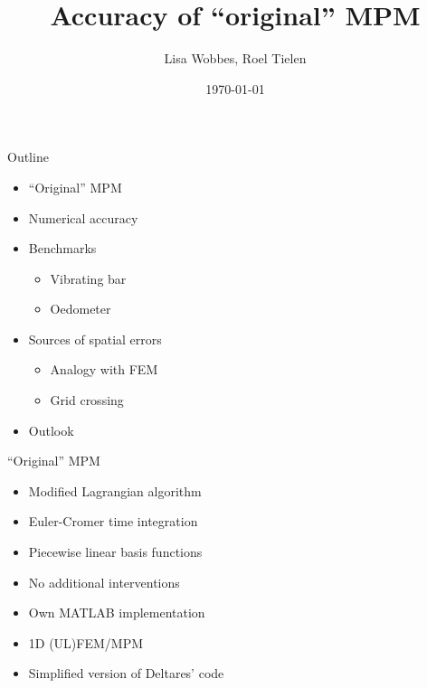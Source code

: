 \documentclass[mathserif,professionalfont,hyperref={pdfpagelabels=false}]{beamer}
\title[Accuracy of ``original'' MPM]{Accuracy of ``original'' MPM}
\author[]{Lisa Wobbes, Roel Tielen}
\date[\today]{\today}
\begin{document}
{
\frame{\titlepage}
}

\begin{frame}{Outline}
\begin{itemize}
\item ``Original'' MPM
\item Numerical accuracy
\item Benchmarks
	\begin{itemize}
	\item Vibrating bar 
	\item Oedometer
	\end{itemize}
\item Sources of spatial errors
\begin{itemize}
\item Analogy with FEM
\item Grid crossing
\end{itemize}
\item Outlook
\end{itemize}
\end{frame}

\begin{frame}{``Original'' MPM}
\begin{itemize}
\item Modified Lagrangian algorithm
\item Euler-Cromer time integration
\item Piecewise linear basis functions
\item No additional interventions
\pause
\item Own MATLAB implementation
\item 1D (UL)FEM/MPM 
\item Simplified version of Deltares' code
\end{itemize}
\end{frame}
\end{document}
